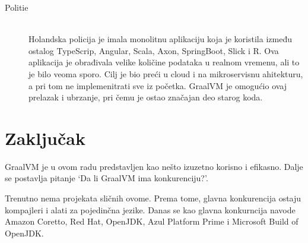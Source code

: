 \documentclass[a4paper]{article}
\begin{document}
\begin{description}
	\item[Politie]  \hfil \\
	Holandska policija je imala monolitnu aplikaciju koja je koristila između ostalog TypeScrip, Angular, Scala, Axon, SpringBoot, Slick i R. Ova aplikacija je obrađivala velike količine podataka u realnom vremenu, ali to je bilo veoma sporo. Cilj je bio preći u cloud i na mikroservisnu ahitekturu, a pri tom ne implemenitrati sve iz početka. GraalVM je omogućio ovaj prelazak i ubrzanje, pri čemu je ostao značajan deo starog koda.\cite{graalvmusecases}
	
\end{description}


\section{Zaključak}
\label{sec:zakljucak}
GraalVM je u ovom radu predstavljen kao nešto izuzetno korisno i efikasno. Dalje se postavlja pitanje `Da li GraalVM ima konkurenciju?'.

Trenutno nema projekata sličnih ovome. Prema tome, glavna konkurencija ostaju kompajleri i alati za pojedinčna jezike. Danas se kao glavna konkurncija navode Amazon Coretto, Red Hat, OpenJDK, Azul Platform Prime i Microsoft Build of OpenJDK. 

\appendix
 

\end{document}
